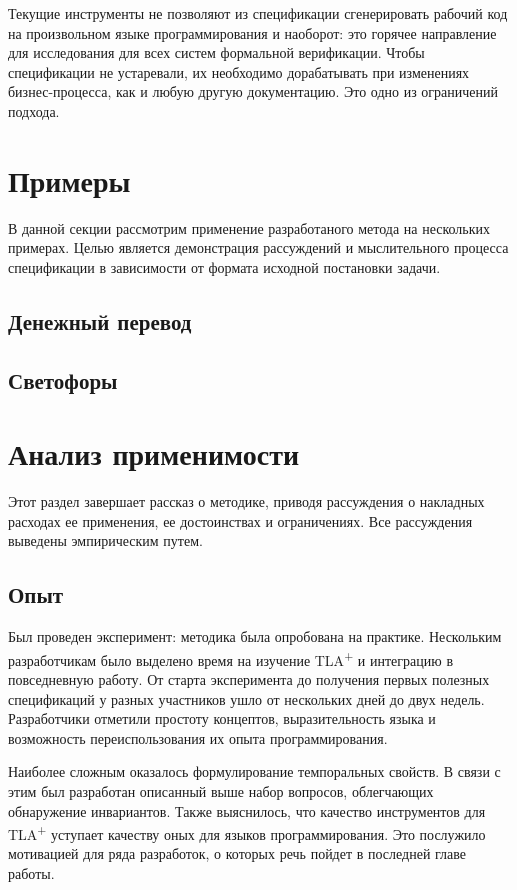 \documentclass[14pt, openany]{book}
\newcommand{\tlapl}{TLA\textsuperscript{+} }
\begin{document}
Текущие инструменты не позволяют из спецификации сгенерировать рабочий код на произвольном языке программирования и наоборот: это горячее направление для исследования для всех систем формальной верификации. Чтобы спецификации не устаревали, их необходимо дорабатывать при изменениях бизнес-процесса, как и любую другую документацию. Это одно из ограничений подхода.

\section{Примеры}
В данной секции рассмотрим применение разработаного метода на нескольких примерах.
Целью является демонстрация рассуждений и мыслительного процесса спецификации в зависимости от формата исходной постановки задачи.

\subsection{Денежный перевод}

\subsection{Светофоры}

\section{Анализ применимости}
Этот раздел завершает рассказ о методике, приводя рассуждения о накладных расходах ее применения, ее достоинствах и ограничениях.
Все рассуждения выведены эмпирическим путем.

\subsection{Опыт}
Был проведен эксперимент: методика была опробована на практике. Нескольким разработчикам было выделено время на изучение \tlapl и интеграцию в повседневную работу. От старта эксперимента до получения первых полезных спецификаций у разных участников ушло от нескольких дней до двух недель. Разработчики отметили простоту концептов, выразительность языка и возможность переиспользования их опыта программирования. 

Наиболее сложным оказалось формулирование темпоральных свойств. В связи с этим был разработан описанный выше набор вопросов, облегчающих обнаружение инвариантов. Также выяснилось, что качество инструментов для \tlapl уступает качеству оных для языков программирования. Это послужило мотивацией для ряда разработок, о которых речь пойдет в последней главе работы.
\end{document}
